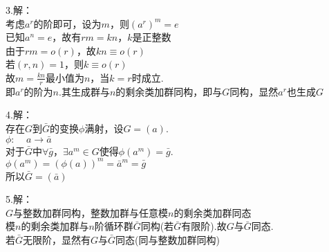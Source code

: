 \documentclass{ctexart}
\begin{document}
3.解：\\
考虑$a^r$的阶即可，设为$m$，则$(a^r)^m=e$\\
已知$a^n=e$，故有$rm=kn$，$k$是正整数\\
由于$rm=o(r)$，故$kn \equiv o(r)$\\
若$(r,n)=1$，则$k \equiv o(r)$\\
故$m=\frac{kn}{r}$最小值为$n$，当$k=r$时成立.\\
即$a^r$的阶为$n$.其生成群与$n$的剩余类加群同构，即与$G$同构，显然$a^r$也生成$G$

4.解：\\
存在$G$到$\bar{G}$的变换$\phi$满射，设$G=(a)$.\\
$\phi: \ \ \ \ \ a \rightarrow \bar{a}$\\
对于$\bar{G}$中$\forall \bar{g}$，$\exists a^m \in G$使得$\phi(a^m)=\bar{g}$.\\
$\phi(a^m)=(\phi(a))^m=\bar{a}^m=\bar{g}$ \\
所以$\bar{G}=(\bar{a})$

5.解：\\
$G$与整数加群同构，整数加群与任意模$n$的剩余类加群同态\\
模$n$的剩余类加群与$n$阶循环群$\bar{G}$同构(若$\bar{G}$有限阶).故$G$与$\bar{G}$同态.\\
若$\bar{G}$无限阶，显然有$G$与$\bar{G}$同态(同与整数加群同构)
\end{document}
